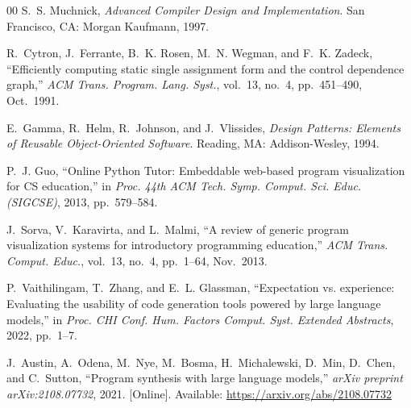 \documentclass[conference]{IEEEtran}
\begin{document}
\begin{thebibliography}{00}
S.~S. Muchnick,
\textit{Advanced Compiler Design and Implementation}.
San Francisco, CA: Morgan Kaufmann, 1997.

R.~Cytron, J.~Ferrante, B.~K. Rosen, M.~N. Wegman, and F.~K. Zadeck,
``Efficiently computing static single assignment form and the control dependence graph,''
\textit{ACM Trans. Program. Lang. Syst.}, vol.~13, no.~4, pp.~451--490, Oct.~1991.

E.~Gamma, R.~Helm, R.~Johnson, and J.~Vlissides,
\textit{Design Patterns: Elements of Reusable Object-Oriented Software}.
Reading, MA: Addison-Wesley, 1994.

P.~J. Guo,
``Online Python Tutor: Embeddable web-based program visualization for CS education,''
in \textit{Proc. 44th ACM Tech. Symp. Comput. Sci. Educ. (SIGCSE)}, 2013, pp.~579--584.

J.~Sorva, V.~Karavirta, and L.~Malmi,
``A review of generic program visualization systems for introductory programming education,''
\textit{ACM Trans. Comput. Educ.}, vol.~13, no.~4, pp.~1--64, Nov.~2013.

P.~Vaithilingam, T.~Zhang, and E.~L. Glassman,
``Expectation vs. experience: Evaluating the usability of code generation tools powered by large language models,''
in \textit{Proc. CHI Conf. Hum. Factors Comput. Syst. Extended Abstracts}, 2022, pp.~1--7.

J.~Austin, A.~Odena, M.~Nye, M.~Bosma, H.~Michalewski, D.~Min, D.~Chen, and C.~Sutton,
``Program synthesis with large language models,''
\textit{arXiv preprint arXiv:2108.07732}, 2021.
[Online]. Available: \url{https://arxiv.org/abs/2108.07732}

\end{thebibliography}
\end{document}

